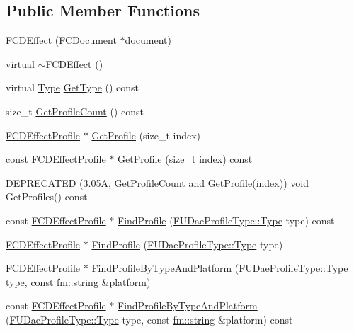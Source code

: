 \subsection*{Public Member Functions}
\begin{DoxyCompactItemize}
\item 
\hyperlink{classFCDEffect_ad2e620e6c041da706302e8541344a5e9}{FCDEffect} (\hyperlink{classFCDocument}{FCDocument} $\ast$document)
\item 
virtual \hyperlink{classFCDEffect_a6c1b6a6d3aefb9c011dd8fa7c116e0d6}{$\sim$FCDEffect} ()
\item 
virtual \hyperlink{classFCDEntity_a9301a4bd5f4d4190ec13e40db4effdd7}{Type} \hyperlink{classFCDEffect_ab6106f67f33a4cb049ea17a1970bbfbe}{GetType} () const 
\item 
size\_\-t \hyperlink{classFCDEffect_a07ca7c378d3ecf158beefe5ba35143ae}{GetProfileCount} () const 
\item 
\hyperlink{classFCDEffectProfile}{FCDEffectProfile} $\ast$ \hyperlink{classFCDEffect_a22c8dc9f098387eaa2ffb6a66aceb22d}{GetProfile} (size\_\-t index)
\item 
const \hyperlink{classFCDEffectProfile}{FCDEffectProfile} $\ast$ \hyperlink{classFCDEffect_aad9b921743685b02b847d30670dc1631}{GetProfile} (size\_\-t index) const 
\item 
\hyperlink{classFCDEffect_a227ef80a932cf071f0fdd299b00cfed9}{DEPRECATED} (3.05A, GetProfileCount and GetProfile(index)) void GetProfiles() const 
\item 
const \hyperlink{classFCDEffectProfile}{FCDEffectProfile} $\ast$ \hyperlink{classFCDEffect_ad81082bec4aa4d90bf595b598e8f3330}{FindProfile} (\hyperlink{namespaceFUDaeProfileType_ac10ea253a7a141708de2324a929f8a79}{FUDaeProfileType::Type} type) const 
\item 
\hyperlink{classFCDEffectProfile}{FCDEffectProfile} $\ast$ \hyperlink{classFCDEffect_a110a7d6488fc376b63e3f6ef7166e0c4}{FindProfile} (\hyperlink{namespaceFUDaeProfileType_ac10ea253a7a141708de2324a929f8a79}{FUDaeProfileType::Type} type)
\item 
\hyperlink{classFCDEffectProfile}{FCDEffectProfile} $\ast$ \hyperlink{classFCDEffect_a439f45f6a34e9ae11990e8bded9b9867}{FindProfileByTypeAndPlatform} (\hyperlink{namespaceFUDaeProfileType_ac10ea253a7a141708de2324a929f8a79}{FUDaeProfileType::Type} type, const \hyperlink{classfm_1_1stringT}{fm::string} \&platform)
\item 
const \hyperlink{classFCDEffectProfile}{FCDEffectProfile} $\ast$ \hyperlink{classFCDEffect_a6f82a6071958b135a8655702d3875b58}{FindProfileByTypeAndPlatform} (\hyperlink{namespaceFUDaeProfileType_ac10ea253a7a141708de2324a929f8a79}{FUDaeProfileType::Type} type, const \hyperlink{classfm_1_1stringT}{fm::string} \&platform) const 

\end{DoxyCompactItemize}
